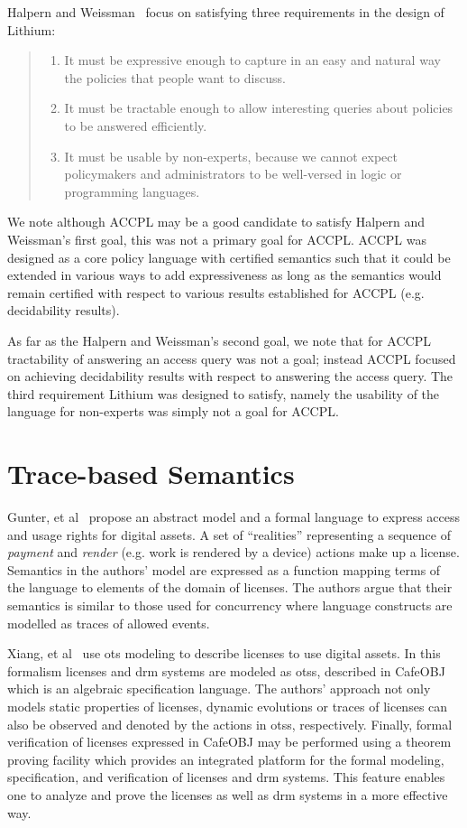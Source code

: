 Halpern and Weissman~\cite{Halpern2008} focus on satisfying three requirements in the design of Lithium:
\begin{quote}
\begin{enumerate}
  \item It must be expressive enough to capture in an easy and natural way the policies that people want to discuss.
  \item It must be tractable enough to allow interesting queries about policies to be answered efficiently.
  \item It must be usable by non-experts, because we cannot expect policymakers and administrators to be well-versed in logic or programming languages.
\end{enumerate}
\end{quote}
We note although \ac{ACCPL} may be a good candidate to satisfy Halpern and Weissman's first goal, this was not a primary goal for \ac{ACCPL}. \ac{ACCPL} was designed as a core policy language with certified semantics such that it could be extended in various ways to add expressiveness as long as the semantics would remain certified with respect to various results established for \ac{ACCPL} (e.g. decidability results).  

As far as the Halpern and Weissman's second goal, we note that for \ac{ACCPL} tractability of answering an access query was not a goal; instead \ac{ACCPL} focused on achieving decidability results with respect to answering the access query. The third requirement Lithium was designed to satisfy, namely the usability of the language for non-experts was simply not a goal for \ac{ACCPL}. 

\section{Trace-based Semantics}
Gunter, et al~\cite{GunterWW01} propose an abstract model and a formal language to express access and usage rights for digital assets. A set of ``realities'' representing a sequence of \emph{payment} and \emph{render} (e.g. work is rendered by a device) actions make up a license. Semantics in the authors' model are expressed as a function mapping terms of the language to elements of the domain of licenses. The authors argue that their semantics is similar to those used for concurrency where language constructs are modelled as traces of allowed events.

Xiang, et al~\cite{xiang2008formal} use \ac{ots} modeling to describe licenses to use digital assets. In this formalism licenses and \ac{drm} systems are modeled as \ac{ots}s, described in CafeOBJ~\cite{cafeobj} which is an algebraic specification language. The authors' approach not only models static properties of licenses, dynamic evolutions or traces of licenses can also be observed and denoted by the actions in \ac{ots}s, respectively. Finally, formal verification of licenses expressed in CafeOBJ may be performed using a theorem proving facility which provides an integrated platform for the formal modeling, specification, and verification of licenses and \ac{drm} systems. This feature enables one to analyze and prove the licenses as well as \ac{drm} systems in a more effective way.

